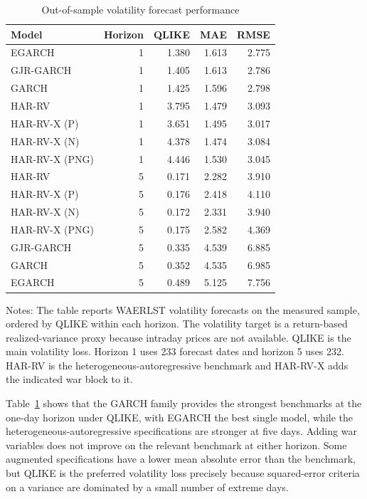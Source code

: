 \documentclass[12pt,a4paper]{article}
\begin{document}
\begin{table}[H]
\centering
\caption{Out-of-sample volatility forecast performance}
\label{tab:volatility_forecasts}
\begin{threeparttable}
\begin{tabular}{lrrrr}
\toprule
Model & Horizon & QLIKE & MAE & RMSE \\
\midrule
EGARCH & 1 & 1.380 & 1.613 & 2.775 \\
GJR-GARCH & 1 & 1.405 & 1.613 & 2.786 \\
GARCH & 1 & 1.425 & 1.596 & 2.798 \\
HAR-RV & 1 & 3.795 & 1.479 & 3.093 \\
HAR-RV-X (P) & 1 & 3.651 & 1.495 & 3.017 \\
HAR-RV-X (N) & 1 & 4.378 & 1.474 & 3.084 \\
HAR-RV-X (PNG) & 1 & 4.446 & 1.530 & 3.045 \\
\addlinespace
HAR-RV & 5 & 0.171 & 2.282 & 3.910 \\
HAR-RV-X (P) & 5 & 0.176 & 2.418 & 4.110 \\
HAR-RV-X (N) & 5 & 0.172 & 2.331 & 3.940 \\
HAR-RV-X (PNG) & 5 & 0.175 & 2.582 & 4.369 \\
GJR-GARCH & 5 & 0.335 & 4.539 & 6.885 \\
GARCH & 5 & 0.352 & 4.535 & 6.985 \\
EGARCH & 5 & 0.489 & 5.125 & 7.756 \\
\bottomrule
\end{tabular}
\begin{tablenotes}
\small
\item Notes: The table reports WAERLST volatility forecasts on the measured sample, ordered by QLIKE within each horizon. The volatility target is a return-based realized-variance proxy because intraday prices are not available. QLIKE is the main volatility loss. Horizon 1 uses 233 forecast dates and horizon 5 uses 232. HAR-RV is the heterogeneous-autoregressive benchmark and HAR-RV-X adds the indicated war block to it.
\end{tablenotes}
\end{threeparttable}
\end{table}

Table~\ref{tab:volatility_forecasts} shows that the GARCH family provides the strongest benchmarks at the one-day horizon under QLIKE, with EGARCH the best single model, while the heterogeneous-autoregressive specifications are stronger at five days. Adding war variables does not improve on the relevant benchmark at either horizon. Some augmented specifications have a lower mean absolute error than the benchmark, but QLIKE is the preferred volatility loss precisely because squared-error criteria on a variance are dominated by a small number of extreme days.
\end{document}
